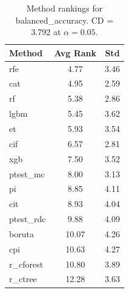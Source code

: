 \begin{table}[h]
\centering
\caption{Method rankings for balanced_accuracy. CD = 3.792 at $\alpha=0.05$.}
\label{tab:ranks_balanced_accuracy}
\begin{tabular}{lcc}
\toprule
Method & Avg Rank & Std \\
\midrule
rfe & 4.77 & 3.46 \\
cat & 4.95 & 2.59 \\
rf & 5.38 & 2.86 \\
lgbm & 5.45 & 3.62 \\
et & 5.93 & 3.54 \\
cif & 6.57 & 2.81 \\
xgb & 7.50 & 3.52 \\
ptest_mc & 8.00 & 3.13 \\
pi & 8.85 & 4.11 \\
cit & 8.93 & 4.04 \\
ptest_rdc & 9.88 & 4.09 \\
boruta & 10.07 & 4.26 \\
cpi & 10.63 & 4.27 \\
r_cforest & 10.80 & 3.89 \\
r_ctree & 12.28 & 3.63 \\
\bottomrule
\end{tabular}
\end{table}